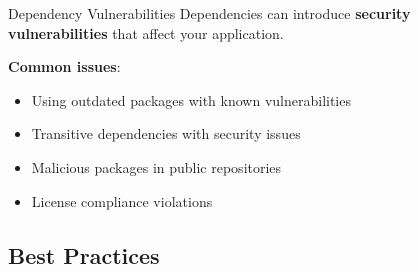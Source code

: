 \documentclass{beamer}
\begin{document}
\begin{frame}[t]{Dependency Vulnerabilities}
Dependencies can introduce \textbf{security vulnerabilities} that affect your application.

\bigskip

\textbf{Common issues}:
\begin{itemize}
\item Using outdated packages with known vulnerabilities
\item Transitive dependencies with security issues
\item Malicious packages in public repositories
\item License compliance violations
\end{itemize}

% 
\end{frame}

\subsection{Best Practices}
\end{document}
